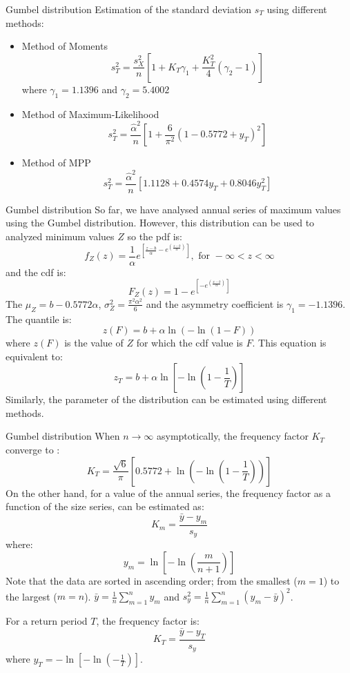\documentclass[8pt]{beamer}
\renewcommand{\emph}[1]{\textcolor{myorange}{#1}}
\begin{document}
\begin{frame}{Gumbel distribution}
    Estimation of the \emph{standard deviation $s_T$} using different methods:
    \begin{itemize}
        \item \emph{Method of Moments}
            \[
                s_T^2 = \frac{s_X^2}{n} \left[ 1 + K_T \gamma_1 + \frac{K_T^2}{4} (\gamma_2 - 1) \right]
            \]
            where $\gamma_1 = 1.1396$ and $\gamma_2 = 5.4002$
        \item \emph{Method of Maximum-Likelihood}
            \[
            s_T^2 = \frac{\hat{\alpha}^2}{n} \left[ 1 + \frac{6}{\pi^2} (1-0.5772 + y_T )^2 \right]
        \]

        \item \emph{Method of MPP}
            \[
            s_T^2 = \frac{\hat{\alpha}^2}{n} \left[ 1.1128 + 0.4574 y_T + 0.8046 y_T^2 \right]
        \]
    \end{itemize}
\end{frame}

\begin{frame}{Gumbel distribution}
    So far, we have analysed annual series of \emph{maximum values} using the \emph{Gumbel distribution}. However, this distribution can be used to analyzed \emph{minimum values} $Z$ so the \emph{pdf} is: 
    \[
        f_Z (z) = \frac{1}{\alpha} e^{\left[ \frac{z-b}{\alpha} -e^{\left( \frac{z-b}{\alpha} \right) }\right]}, \text{ for } -\infty < z < \infty
    \]
    and the \emph{cdf} is: 
\[
    F_Z (z) = 1- e^{\left[-e^{\left( \frac{x-b}{\alpha} \right)} \right]}
\]
The $\mu_Z = b - 0.5772 \alpha$, $\sigma_Z^2 = \frac{\pi^2 \alpha^2}{6}$ and the asymmetry coefficient is $\gamma_1 = -1.1396$. The \emph{quantile} is:
\[
z(F) = b + \alpha \ln(-\ln (1-F))
\]
where $z(F)$ is the value of $Z$ for which the \emph{cdf} value is $F$. This equation is equivalent to:
\[
    z_T = b + \alpha \ln \left[ -\ln \left( 1- \frac{1}{T} \right) \right]
\]
Similarly, the parameter of the distribution can be estimated using different methods.
\end{frame}


\begin{frame}{Gumbel distribution}
When $n\rightarrow \infty$ asymptotically, the \emph{frequency factor $K_T$} converge to :
    \[
        K_T =  \frac{\sqrt{6}}{\pi} \left[ 0.5772 + \ln \left( -\ln \left( 1-\frac{1}{T} \right) \right) \right]
    \]
    On the other hand, for a value of the annual series, the \emph{frequency factor} as a function of the size series, can be estimated as:
    \[
        K_m = \frac{\bar{y} - y_m }{s_y}
    \]
    where:
\[
    y_m  = \ln \left[ -\ln \left( \frac{m}{n+1} \right) \right]
\]
Note that the data are sorted in ascending order; from the smallest ($m=1$) to the largest ($m=n$). $\bar{y} = \frac{1}{n} \sum_{m=1}^n y_m$ and $s_y^2 = \frac{1}{n} \sum_{m=1}^n (y_m - \bar{y})^2$.

For a \emph{return period} $T$, the \emph{frequency factor} is:
\[
    K_T = \frac{\bar{y} - y_T}{s_y}
\]
where $y_T = -\ln \left[ -\ln \left(- \frac{1}{T} \right) \right]$. 
\end{frame}
\end{document}
